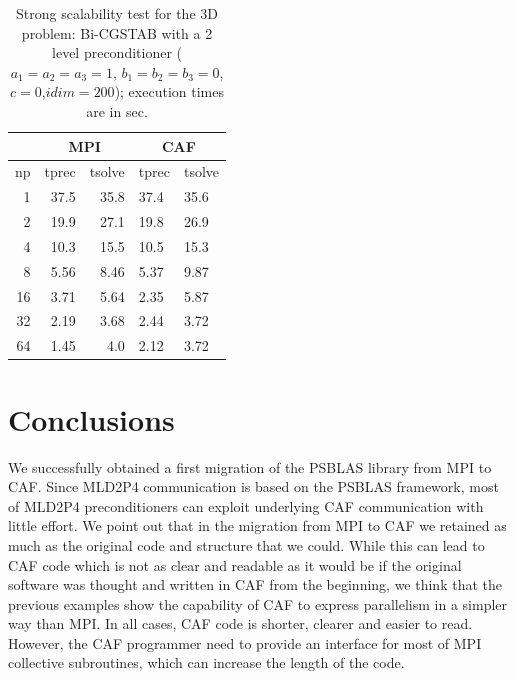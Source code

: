 \documentclass{IOS-Book-Article}
\begin{document}
\begin{table}[ht]
\centering
\caption{Strong scalability test for the 3D problem: Bi-CGSTAB with a 2 level preconditioner ($a_1=a_2=a_3=1$, $b_1=b_2=b_3=0$, $c=0$,$idim=200$); 
execution times are in sec.} 
\label{Strong2}
\begin{tabular}{@{}rrrll@{}}
\toprule
\multicolumn{1}{l}{}   & \multicolumn{2}{c}{MPI}                                & \multicolumn{2}{c}{CAF} \\ \midrule
\multicolumn{1}{c}{np} & \multicolumn{1}{c}{tprec} & \multicolumn{1}{c}{tsolve} & tprec      & tsolve     \\ \midrule
1                      & 37.5                      & 35.8                       & 37.4       & 35.6       \\
2                      & 19.9                      & 27.1                       & 19.8       & 26.9       \\
4                      & 10.3                      & 15.5                       & 10.5       & 15.3       \\
8                      & 5.56                      & 8.46                       & 5.37       & 9.87       \\
16                     & 3.71                      & 5.64                       & 2.35       & 5.87       \\
32                     & 2.19                      & 3.68                       & 2.44       & 3.72       \\
64                     & 1.45                      & 4.0                        & 2.12       & 3.72       \\ \bottomrule
\end{tabular}
\end{table} 
  
\section{Conclusions} \label{sec:concl}

We successfully obtained a first migration of the  PSBLAS library from
MPI to CAF. Since MLD2P4 
communication is based on the PSBLAS framework, most of MLD2P4
preconditioners can exploit underlying CAF communication with little
effort. We point out that in the migration from MPI to CAF we retained
as much as the original code and structure that we could. While this
can lead to CAF code which is not as clear and readable as it would be
if the original software was thought and written in CAF from the
beginning, we think that the previous examples show the capability of
CAF to express parallelism in a simpler way than MPI. In all cases,
CAF code is shorter, clearer and easier to read. However, the CAF
programmer need to provide an interface for most of MPI collective
subroutines, which can increase the length of the code.  
\end{document}
